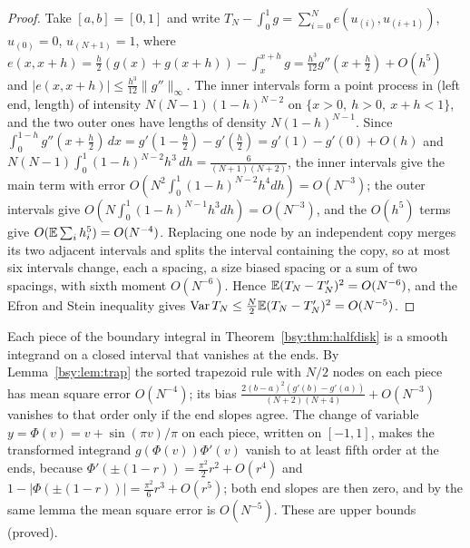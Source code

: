 \begin{proof}
Take $[a,b]=[0,1]$ and write $T_N-\int_0^1g=\sum_{i=0}^Ne(u_{(i)},u_{(i+1)})$, $u_{(0)}=0$, $u_{(N+1)}=1$, where $e(x,x+h)=\frac h2(g(x)+g(x+h))-\int_x^{x+h}g=\frac{h^3}{12}g''(x+\frac h2)+O(h^5)$ and $|e(x,x+h)|\le\frac{h^3}{12}\|g''\|_\infty$. The inner intervals form a point process in (left end, length) of intensity $N(N-1)(1-h)^{N-2}$ on $\{x>0,\ h>0,\ x+h<1\}$, and the two outer ones have lengths of density $N(1-h)^{N-1}$. Since $\int_0^{1-h}g''(x+\frac h2)\,dx=g'(1-\frac h2)-g'(\frac h2)=g'(1)-g'(0)+O(h)$ and $N(N-1)\int_0^1(1-h)^{N-2}h^3\,dh=\frac6{(N+1)(N+2)}$, the inner intervals give the main term with error $O(N^2\int_0^1(1-h)^{N-2}h^4dh)=O(N^{-3})$; the outer intervals give $O(N\int_0^1(1-h)^{N-1}h^3dh)=O(N^{-3})$, and the $O(h^5)$ terms give $O(\mathbb{E}\sum_ih_i^5)=O(N^{-4})$. Replacing one node by an independent copy merges its two adjacent intervals and splits the interval containing the copy, so at most six intervals change, each a spacing, a size biased spacing or a sum of two spacings, with sixth moment $O(N^{-6})$. Hence $\mathbb{E}(T_N-T_N')^2=O(N^{-6})$, and the Efron and Stein inequality gives $\mathrm{Var}\,T_N\le\frac N2\mathbb{E}(T_N-T_N')^2=O(N^{-5})$.
\end{proof}

\begin{resultpar}\label{bsy:res:halfdisk_rates}
Each piece of the boundary integral in Theorem~\ref{bsy:thm:halfdisk} is a smooth integrand on a closed interval that vanishes at the ends. By Lemma~\ref{bsy:lem:trap} the sorted trapezoid rule with $N/2$ nodes on each piece has mean square error $O(N^{-4})$; its bias $\frac{2(b-a)^2(g'(b)-g'(a))}{(N+2)(N+4)}+O(N^{-3})$ vanishes to that order only if the end slopes agree. The change of variable $y=\Phi(v)=v+\sin(\pi v)/\pi$ on each piece, written on $[-1,1]$, makes the transformed integrand $g(\Phi(v))\Phi'(v)$ vanish to at least fifth order at the ends, because $\Phi'(\pm(1-r))=\frac{\pi^2}2r^2+O(r^4)$ and $1-|\Phi(\pm(1-r))|=\frac{\pi^2}6r^3+O(r^5)$; both end slopes are then zero, and by the same lemma the mean square error is $O(N^{-5})$. These are upper bounds (proved).
\end{resultpar}

